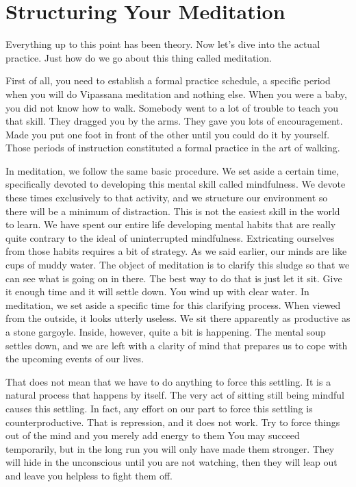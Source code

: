 \chapter{Structuring Your Meditation} 

Everything up to this point has been theory. Now let's dive into the actual
practice. Just how do we go about this thing called meditation.

First of all, you need to establish a formal practice schedule, a specific
period when you will do Vipassana meditation and nothing else. When you were a
baby, you did not know how to walk. Somebody went to a lot of trouble to teach
you that skill. They dragged you by the arms. They gave you lots of
encouragement. Made you put one foot in front of the other until you could do it
by yourself. Those periods of instruction constituted a formal practice in the
art of walking.

In meditation, we follow the same basic procedure. We set aside a certain time,
specifically devoted to developing this mental skill called mindfulness. We
devote these times exclusively to that activity, and we structure our
environment so there will be a minimum of distraction. This is not the easiest
skill in the world to learn. We have spent our entire life developing mental
habits that are really quite contrary to the ideal of uninterrupted mindfulness.
Extricating ourselves from those habits requires a bit of strategy. As we said
earlier, our minds are like cups of muddy water. The object of meditation is to
clarify this sludge so that we can see what is going on in there. The best way
to do that is just let it sit. Give it enough time and it will settle down. You
wind up with clear water. In meditation, we set aside a specific time for this
clarifying process. When viewed from the outside, it looks utterly useless. We
sit there apparently as productive as a stone gargoyle. Inside, however, quite a
bit is happening. The mental soup settles down, and we are left with a clarity
of mind that prepares us to cope with the upcoming events of our lives.

That does not mean that we have to do anything to force this settling. It is a
natural process that happens by itself. The very act of sitting still being
mindful causes this settling. In fact, any effort on our part to force this
settling is counterproductive. That is repression, and it does not work. Try to
force things out of the mind and you merely add energy to them You may succeed
temporarily, but in the long run you will only have made them stronger. They
will hide in the unconscious until you are not watching, then they will leap out
and leave you helpless to fight them off.

